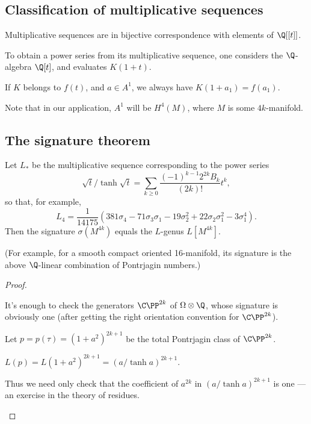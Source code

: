 \documentclass[11pt]{article}
\begin{document}
\begin{SignatureThmTalk}
\subsection*{Classification of multiplicative sequences}
\begin{lem*}[Hirzebruch]\hfil
\begin{itemise}
\item Multiplicative sequences are in bijective correspondence with elements of $\Q[[t]]$.
\item To obtain a power series from its multiplicative sequence, one considers the $\Q$-algebra $\Q[t]$, and evaluates $K(1+t)$.
\item If $K$ belongs to $f(t)$, and $a\in A^1$, we always have $K(1+a_1)=f(a_1)$.
\end{itemise}
\end{lem*}
\noindent Note that in our application, $A^1$ will be $H^4(M)$, where $M$ is some $4k$-manifold.
\subsection*{The signature theorem}
\begin{thm*}
Let $L_*$ be the multiplicative sequence corresponding to the power series
\[\sqrt t/\tanh\sqrt t=\sum_{k\geq0}\frac{(-1)^{k-1} 2^{2k}B_k}{(2k)!}t^k,\]
so that, for example,
\[L_4=\frac{1}{14175}\left(381\sigma_4-71\sigma_3\sigma_1
-19\sigma_2^2+22\sigma_2\sigma_1^2-3\sigma_1^4\right).\]
Then the signature $\sigma(M^{4k})$ equals the $L$-genus $L[M^{4k}]$.
\end{thm*}
\noindent(For example, for a smooth compact oriented 16-manifold, its signature is the above $\Q$-linear combination of Pontrjagin numbers.)
\begin{proof}\hfil
\begin{itemise}
\item It's enough to check the generators $\CP^{2k}$ of $\Omega\otimes\Q$, whose signature is obviously one (after getting the right orientation convention for $\CP^{2k}$).
\item Let $p=p(\tau)=(1+a^2)^{2k+1}$ be the total Pontrjagin class of $\CP^{2k}$.
\item $L(p)=L(1+a^2)^{2k+1}=(a/\tanh a)^{2k+1}$.
\item Thus we need only check that the coefficient of $a^{2k}$ in $(a/\tanh a)^{2k+1}$ is one --- an exercise in the theory of residues.\qedhere
\end{itemise}
\end{proof}

\pagebreak
\end{SignatureThmTalk}
\end{document}
